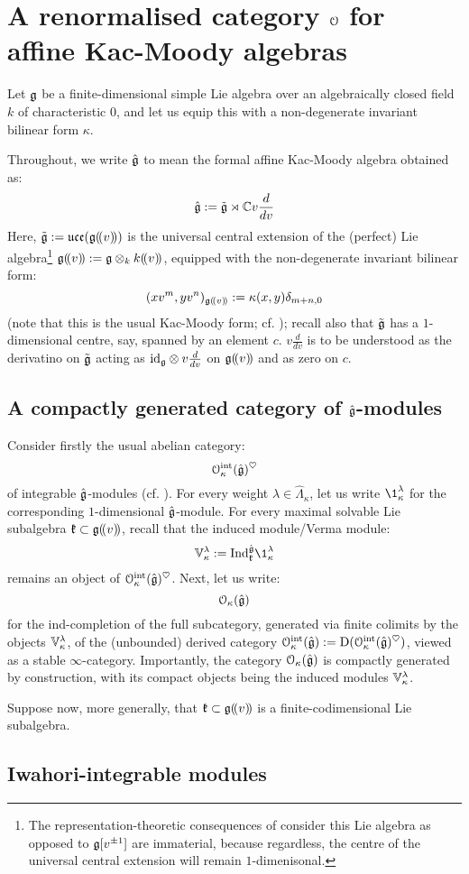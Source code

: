 \section{A renormalised category \texorpdfstring{$\mathcal{O}$}{} for affine Kac-Moody algebras}
    \begin{convention}
        Let $\mathfrak{g}$ be a finite-dimensional simple Lie algebra over an algebraically closed field $k$ of characteristic $0$, and let us equip this with a non-degenerate invariant bilinear form $\kappa$. 
    
        Throughout, we write $\hat{\mathfrak{g}}$ to mean the formal affine Kac-Moody algebra obtained as:
            $$\hat{\mathfrak{g}} := \tilde{\mathfrak{g}} \rtimes \mathbb{C} v \frac{d}{dv}$$
        Here, $\tilde{\mathfrak{g}} := \mathfrak{uce}( \mathfrak{g}(\!(v)\!) )$ is the universal central extension of the (perfect) Lie algebra\footnote{The representation-theoretic consequences of consider this Lie algebra as opposed to $\mathfrak{g}[v^{\pm 1}]$ are immaterial, because regardless, the centre of the universal central extension will remain $1$-dimenisonal.} $\g(\!(v)\!) := \g \tensor_k k(\!(v)\!)$, equipped with the non-degenerate invariant bilinear form:
            $$(x v^m, y v^n)_{\mathfrak{g}(\!(v)\!)} := \kappa(x, y) \delta_{m + n, 0}$$
        (note that this is the usual Kac-Moody form; cf. \cite[Chapters 2 and 7]{kac_infinite_dimensional_lie_algebras}); recall also that $\tilde{\mathfrak{g}}$ has a $1$-dimensional centre, say, spanned by an element $c$. $v \frac{d}{dv}$ is to be understood as the derivatino on $\tilde{\mathfrak{g}}$ acting as $\id_{\g} \tensor v \frac{d}{dv}$ on $\mathfrak{g}(\!(v)\!)$ and as zero on $c$. 
    \end{convention}

    \subsection{A compactly generated category of \texorpdfstring{$\hat{\mathfrak{g}}$}{}-modules}
        Consider firstly the usual abelian category:
            $$\mathcal{O}_{\kappa}^{\mathrm{int}}(\hat{\mathfrak{g}})^{\heartsuit}$$
        of integrable $\hat{\mathfrak{g}}$-modules (cf. \cite[Chapter 9]{kac_infinite_dimensional_lie_algebras}). For every weight $\lambda \in \hat{\Lambda}_{\kappa}$, let us write $\1^{\lambda}_{\kappa}$ for the corresponding $1$-dimensional $\hat{\mathfrak{g}}$-module. For every maximal solvable Lie subalgebra $\mathfrak{k} \subset \mathfrak{g}(\!(v)\!)$, recall that the induced module/Verma module:
            $$\V^{\lambda}_{\kappa} := \Ind_{\k}^{\hat{\g}} \1^{\lambda}_{\kappa}$$
        remains an object of $\mathcal{O}_{\kappa}^{\mathrm{int}}(\hat{\mathfrak{g}})^{\heartsuit}$. Next, let us write:
            $$\mathcal{O}_{\kappa}(\hat{\mathfrak{g}})$$
        for the ind-completion of the full subcategory, generated via finite colimits by the objects $\mathbb{V}^{\lambda}_{\kappa}$, of the (unbounded) derived category $\mathcal{O}_{\kappa}^{\mathrm{int}}(\hat{\mathfrak{g}}) := \mathrm{D}( \mathcal{O}_{\kappa}^{\mathrm{int}}(\hat{\mathfrak{g}})^{\heartsuit} )$, viewed as a stable $\infty$-category. Importantly, the category $\mathcal{O}_{\kappa}(\hat{\mathfrak{g}})$ is compactly generated by construction, with its compact objects being the induced modules $\mathbb{V}^{\lambda}_{\kappa}$. 

        Suppose now, more generally, that $\mathfrak{k} \subset \mathfrak{g}(\!(v)\!)$ is a finite-codimensional Lie subalgebra.

    \subsection{Iwahori-integrable modules}